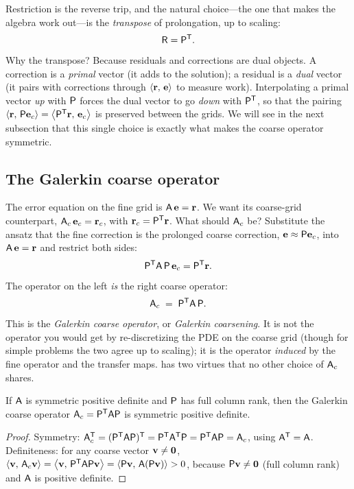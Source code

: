 Restriction is the reverse trip, and the natural choice---the one that makes the algebra
work out---is the \emph{transpose} of prolongation, up to scaling:
\[
  \mathsf{R} = \mathsf{P}^{\mathsf T}.
\]
Why the transpose? Because residuals and corrections are dual objects. A correction is a
\emph{primal} vector (it adds to the solution); a residual is a \emph{dual} vector (it
pairs with corrections through $\left\langle \mathbf{r},\, \mathbf{e}\right\rangle$ to measure work). Interpolating a
primal vector \emph{up} with $\mathsf{P}$ forces the dual vector to go \emph{down} with
$\mathsf{P}^{\mathsf T}$, so that the pairing $\left\langle \mathbf{r},\, \mathsf{P}\mathbf{e}_c\right\rangle =
\left\langle \mathsf{P}^{\mathsf T}\mathbf{r},\, \mathbf{e}_c\right\rangle$ is preserved between the grids. We will see in the
next subsection that this single choice is exactly what makes the coarse operator
symmetric.

\subsection{The Galerkin coarse operator}

The error equation on the fine grid is $\mathsf{A}\,\mathbf{e}=\mathbf{r}$. We want its coarse-grid
counterpart, $\mathsf{A}_c\,\mathbf{e}_c = \mathbf{r}_c$, with $\mathbf{r}_c=\mathsf{P}^{\mathsf T}\mathbf{r}$. What should
$\mathsf{A}_c$ be? Substitute the ansatz that the fine correction is the prolonged coarse
correction, $\mathbf{e} \approx \mathsf{P}\mathbf{e}_c$, into $\mathsf{A}\,\mathbf{e} = \mathbf{r}$ and restrict both
sides:
\[
  \mathsf{P}^{\mathsf T}\mathsf{A}\,\mathsf{P}\,\mathbf{e}_c = \mathsf{P}^{\mathsf T}\mathbf{r}.
\]
The operator on the left \emph{is} the right coarse operator:
\begin{equation}
  \mathsf{A}_c \;=\; \mathsf{P}^{\mathsf T}\mathsf{A}\,\mathsf{P}.
  \label{eq:galerkin}
\end{equation}
This is the \emph{Galerkin coarse operator}, or \emph{Galerkin coarsening}. It is not the
operator you would get by re-discretizing the PDE on the coarse grid (though for simple
problems the two agree up to scaling); it is the operator \emph{induced} by the fine
operator and the transfer maps.  has two virtues that no other choice
of $\mathsf{A}_c$ shares.

\begin{lemma}
\label{lem:galerkin}
If $\mathsf{A}$ is symmetric positive definite and $\mathsf{P}$ has full column rank, then the
Galerkin coarse operator $\mathsf{A}_c = \mathsf{P}^{\mathsf T}\mathsf{A}\mathsf{P}$ is symmetric
positive definite.
\end{lemma}
\begin{proof}
Symmetry: $\mathsf{A}_c^{\mathsf T} = (\mathsf{P}^{\mathsf T}\mathsf{A}\mathsf{P})^{\mathsf T} =
\mathsf{P}^{\mathsf T}\mathsf{A}^{\mathsf T}\mathsf{P} = \mathsf{P}^{\mathsf T}\mathsf{A}\mathsf{P} =
\mathsf{A}_c$, using $\mathsf{A}^{\mathsf T}=\mathsf{A}$. Definiteness: for any coarse vector
$\mathbf{v}\ne\mathbf 0$, $\left\langle \mathbf{v},\, \mathsf{A}_c\mathbf{v}\right\rangle = \left\langle \mathbf{v},\, \mathsf{P}^{\mathsf
T}\mathsf{A}\mathsf{P}\mathbf{v}\right\rangle = \left\langle \mathsf{P}\mathbf{v},\, \mathsf{A}(\mathsf{P}\mathbf{v})\right\rangle > 0$, because $\mathsf{P}\mathbf{v}
\ne \mathbf 0$ (full column rank) and $\mathsf{A}$ is positive definite.
\end{proof}

